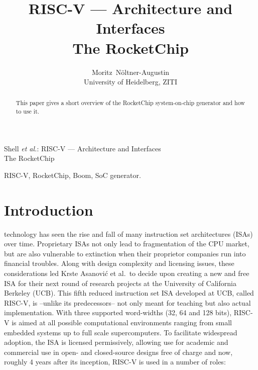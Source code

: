 \documentclass[journal]{IEEEtran}
\def\krste/{Krste Asanovi\'c}
\begin{document}


\title{RISC-V --- Architecture and Interfaces\\The RocketChip}


\author{Moritz~N\"oltner-Augustin\\%
		University of Heidelberg, ZITI}

%
{Shell \MakeLowercase{\textit{et al.}}: RISC-V --- Architecture and Interfaces\\The RocketChip}


\maketitle

\begin{abstract}
This paper gives a short overview of the RocketChip system-on-chip generator and how to use it.
\end{abstract}

\begin{IEEEkeywords}
RISC-V, RocketChip, Boom, SoC generator.
\end{IEEEkeywords}


\section{Introduction}
 technology has seen the rise and fall of many instruction set architectures (ISAs) over time.
Proprietary ISAs not only lead to fragmentation of the CPU market, but are also vulnerable to extinction when their proprietor companies run into financial troubles.
Along with design complexity and licensing issues, these considerations led \krste/ et al.\ to decide upon creating a new and free ISA for their next round of research projects at the University of California Berkeley (UCB).
This fifth reduced instruction set ISA developed at UCB, called RISC-V, is --unlike its predecessors-- not only meant for teaching but also actual implementation.
With three supported word-widths (32, 64 and 128 bits), RISC-V is aimed at all possible computational environments ranging from small embedded systems up to full scale supercomputers.
To facilitate widespread adoption, the ISA is licensed permissively, allowing use for academic and commercial use in open- and closed-source designs free of charge and now, roughly 4 years after its inception, RISC-V is used in a number of roles:
\end{document}
